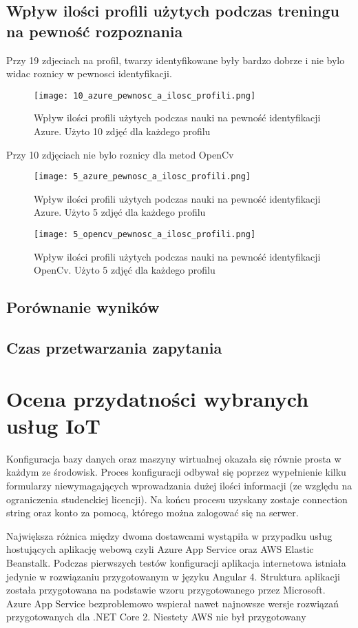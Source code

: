 \subsection{Wpływ ilości profili użytych podczas treningu na pewność rozpoznania}
Przy 19 zdjeciach na profil, twarzy identyfikowane były bardzo dobrze i nie bylo widac roznicy w pewnosci identyfikacji.
\begin{figure}[H]
	\centering
	\texttt{[image: 10\_azure\_pewnosc\_a\_ilosc\_profili.png]}
	\caption{Wpływ ilości profili użytych podczas nauki na pewność identyfikacji Azure. Użyto 10 zdjęć dla każdego profilu}
	\label{fig:azure_10__profile}
\end{figure}
Przy 10 zdjęciach nie bylo roznicy dla metod OpenCv
\begin{figure}[H]
	\centering
	\texttt{[image: 5\_azure\_pewnosc\_a\_ilosc\_profili.png]}
	\caption{Wpływ ilości profili użytych podczas nauki na pewność identyfikacji Azure. Użyto 5 zdjęć dla każdego profilu}
	\label{fig:azure_5__profile}
\end{figure}
\begin{figure}[H]
	\centering
	\texttt{[image: 5\_opencv\_pewnosc\_a\_ilosc\_profili.png]}
	\caption{Wpływ ilości profili użytych podczas nauki na pewność identyfikacji OpenCv. Użyto 5 zdjęć dla każdego profilu}
	\label{fig:azure_5__profile}
\end{figure}

\subsection{Porównanie wyników}
\subsection{Czas przetwarzania zapytania}

\section{Ocena przydatności wybranych usług IoT}



Konfiguracja bazy danych oraz maszyny wirtualnej okazała się równie prosta w każdym ze środowisk. Proces konfiguracji odbywał się poprzez wypełnienie kilku formularzy niewymagających wprowadzania dużej ilości informacji (ze względu na ograniczenia studenckiej licencji). Na końcu procesu uzyskany zostaje connection string oraz konto za pomocą, którego można zalogować się na serwer.

Największa różnica między dwoma dostawcami wystąpiła w przypadku usług hostujących aplikację webową czyli Azure App Service oraz AWS Elastic Beanstalk. Podczas pierwszych testów konfiguracji aplikacja internetowa istniała jedynie w rozwiązaniu przygotowanym w języku Angular 4. Struktura aplikacji została przygotowana na podstawie wzoru przygotowanego przez Microsoft. Azure App Service bezproblemowo wspierał nawet najnowsze wersje rozwiązań przygotowanych dla .NET Core 2. Niestety AWS nie był przygotowany 